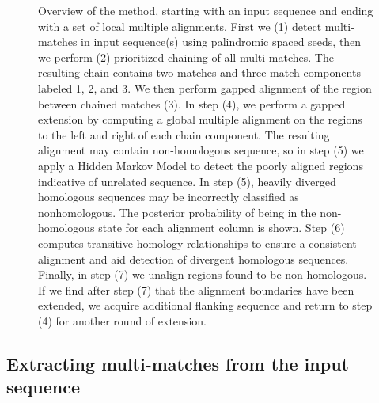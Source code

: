 \documentclass{ws-procs9x6}
\begin{document}
\begin{figure}[p]
\begin{center}
\end{center}
\caption{Overview of the method, starting with an input sequence and ending with a set of local multiple alignments. First we (1) detect multi-matches in input sequence(s) using palindromic spaced seeds, then we perform (2) prioritized chaining of all multi-matches.  The resulting chain contains two matches and three match components labeled 1, 2, and 3.  We then perform gapped alignment of the region between chained matches (3).   In step (4), we perform a gapped extension by computing a global multiple alignment on the regions to the left and right of each chain component.  The resulting alignment may contain non-homologous sequence, so in step (5) we apply a Hidden Markov Model to detect the poorly aligned regions indicative of unrelated sequence.  In step (5), heavily diverged homologous sequences may be incorrectly classified as nonhomologous. The posterior probability of being in the non-homologous state for each alignment column is shown.  Step (6) computes transitive homology relationships to ensure a consistent alignment and aid detection of divergent homologous sequences.  Finally, in step (7) we unalign regions found to be non-homologous.  If we find after step (7) that the alignment boundaries have been extended, we acquire additional flanking sequence and return to step (4) for another round of extension.}
\label{fig-main}
\end{figure}



\subsection{Extracting multi-matches from the input sequence}
\end{document}
